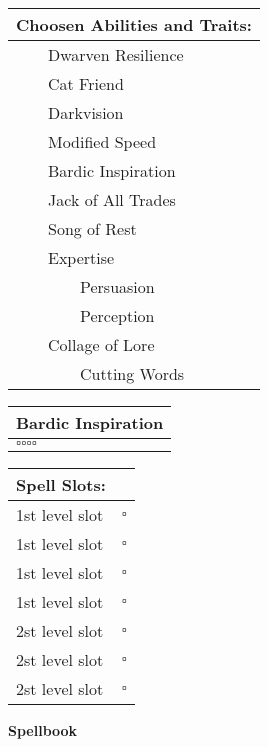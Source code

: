 \documentclass[11pt]{article}
\newcommand{\available}{$\square$}
\newcommand{\tabitem}{~~\llap{--}~~}
\newcommand{\tabtabitem}{~~~~~~\llap{$\bullet$}~~}
\begin{document}
\begin{multicols}{2}
\vspace{2mm}

\noindent \begin{tabularx}{95mm}{@{}l}
{\Large \textbf{Choosen Abilities and Traits:}} \\
\hline
\tabitem Dwarven Resilience	\\
\tabitem Cat Friend			\\
\tabitem Darkvision			\\
\tabitem Modified Speed		\\
\tabitem Bardic Inspiration \\
\tabitem Jack of All Trades \\
\tabitem Song of Rest		\\
\tabitem Expertise			\\
\tabtabitem Persuasion		\\
\tabtabitem Perception		\\
\tabitem Collage of Lore	\\
\tabtabitem Cutting Words
		\end{tabularx}

\vspace{2mm}

\noindent \begin{tabularx}{95mm}{@{}l}
{\Large \textbf{Bardic Inspiration}} \\
\hline
\available \available \available \available
		\end{tabularx}

\vspace{2mm}

\noindent \begin{tabularx}{95mm}{@{}l c}
{\Large \textbf{Spell Slots:}} & \\
\hline
1st level slot & \available \\
1st level slot & \available \\
1st level slot & \available \\
1st level slot & \available \\
2st level slot & \available \\
2st level slot & \available \\
2st level slot & \available
		\end{tabularx}
	\end{multicols}

\clearpage

	\begin{center}
{\LARGE \textbf{Spellbook}}
	\end{center}
\end{document}
